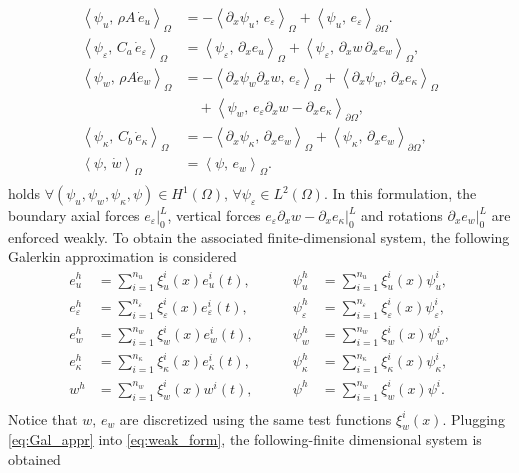 \documentclass{ifacconf}
\newcommand{\inner}[3][]{\ensuremath{\left\langle #2, \, #3 \right\rangle_{#1}}}
\begin{document}
\begin{equation}\label{eq:weak_form}
	\begin{aligned}
		\inner[\Omega]{\psi_u}{\rho A \, \dot{e}_u} &= -\inner[\Omega]{\partial_x \psi_u}{ e_\varepsilon} +  \inner[\partial\Omega]{\psi_u}{e_\varepsilon}. \\
		\inner[\Omega]{\psi_\varepsilon}{C_a \, \dot{e}_\varepsilon} &= \inner[\Omega]{\psi_\varepsilon}{\partial_x e_u} + \inner[\Omega]{\psi_\varepsilon}{\partial_x w \, \partial_x e_w}, \\
		\inner[\Omega]{\psi_w}{\rho A\dot{e}_w} &= -\inner[\Omega]{\partial_x \psi_w \partial_x w}{e_\varepsilon} + \inner[\Omega]{\partial_{x} \psi_w}{\partial_{x} e_\kappa} \\
		&\quad +\inner[\partial\Omega]{\psi_w}{e_\varepsilon \partial_x w - \partial_x e_\kappa}, \\
		\inner[\Omega]{\psi_\kappa}{C_b \, \dot{e}_\kappa} &= - \inner[\Omega]{\partial_{x} \psi_\kappa}{\partial_{x} e_w} + \inner[\partial\Omega]{\psi_\kappa}{\partial_x e_w}, \\
		\inner[\Omega]{\psi}{\dot{w}} &= \inner[\Omega]{\psi}{e_w}. \\
	\end{aligned}
\end{equation}
holds $\forall (\psi_u, \psi_w, \psi_\kappa, \psi) \in H^1(\Omega), \, \forall \psi_\varepsilon \in L^2(\Omega)$. In this formulation, the boundary axial forces $e_\varepsilon\vert_{0}^L$, vertical forces $e_\varepsilon\partial_x w - \partial_x e_\kappa\vert_{0}^L$ and  rotations $\partial_x e_w\vert_{0}^L$ are enforced weakly. To obtain the associated finite-dimensional system, the following Galerkin approximation is considered 
\begin{equation}\label{eq:Gal_appr}
\begin{aligned}
	e_u^h &= \sum_{i=1}^{n_u} \xi_u^i(x) e_u^i(t), \\
	e_\varepsilon^h &= \sum_{i=1}^{n_\varepsilon} \xi_\varepsilon^i(x) e_\varepsilon^i(t), \\
	e_w^h &= \sum_{i=1}^{n_w} \xi_w^i(x) e_w^i(t), \\
	e_\kappa^h &= \sum_{i=1}^{n_\kappa} \xi_\kappa^i(x) e_\kappa^i(t), \\
	w^h &= \sum_{i=1}^{n_w} \xi_w^i(x) w^i(t), \\
\end{aligned} \qquad 
\begin{aligned}
	\psi_u^h &= \sum_{i=1}^{n_u} \xi_u^i(x) \psi_u^i, \\
	\psi_\varepsilon^h &= \sum_{i=1}^{n_\varepsilon} \xi_\varepsilon^i(x) \psi_\varepsilon^i, \\
	\psi_w^h &= \sum_{i=1}^{n_w} \xi_w^i(x) \psi_w^i, \\
    \psi_\kappa^h &= \sum_{i=1}^{n_\kappa} \xi_\kappa^i(x) \psi_\kappa^i, \\
	\psi^h &= \sum_{i=1}^{n_w} \xi_w^i(x) \psi^i. \\
\end{aligned}
\end{equation}
Notice that $w, \, e_w$ are discretized using the same test functions 
$\xi_w^i(x)$. Plugging \eqref{eq:Gal_appr} into \eqref{eq:weak_form}, the following-finite dimensional system is obtained
\end{document}

